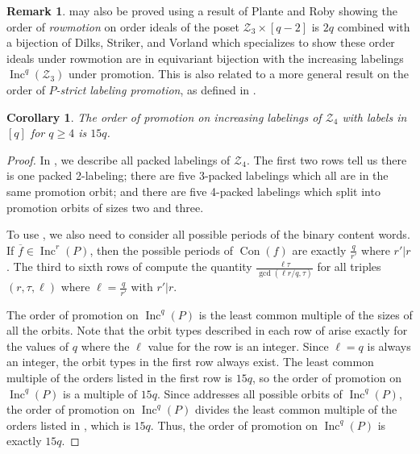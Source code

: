 \documentclass[11pt]{amsart}
\newtheorem{corollary}[theorem]{Corollary}
\theoremstyle{definition}
\newtheorem{remark}[theorem]{Remark}
\DeclareMathOperator{\Inc}{\mathrm{Inc}}
\DeclareMathOperator{\Con}{\mathrm{Con}}
\newcommand{\calZ}{\mathcal{Z}}
\begin{document}
\begin{remark}
 may also be proved using a result of Plante and Roby \cite[Theorem 3.3]{PlanteRobyFPSAC2024} showing the order of \emph{rowmotion} on order ideals of the poset  $\calZ_3\times[q-2]$ is $2q$ combined with a bijection of Dilks, Striker, and Vorland \cite{dilks2019rowmotion} which specializes to show these order ideals under rowmotion are in equivariant bijection with the increasing labelings $\Inc^q(\calZ_3)$ under promotion.
This is also related to a more general result \cite[Theorem 4]{adenbaum2023order} on the order of \emph{$P$-strict labeling promotion}, as defined in \cite{bernstein2024p}.
\end{remark}


\begin{corollary}\label{thm:linear-Z4}
The order of promotion on increasing labelings of $\calZ_4$ with labels in $[q]$ for $q \geq 4$ is $15q$.
\end{corollary}

\begin{proof}
In , we describe all packed labelings of $\calZ_4$.
The first two rows tell us there is one packed 2-labeling; there are five 3-packed labelings which all are in the same promotion orbit; and there are five 4-packed labelings which split into promotion orbits of sizes two and three.

To use , we also need to consider all possible periods of the binary content words. If $\overline{f} \in \Inc^r(P)$, then the possible periods of $\Con(f)$ are exactly $\frac{q}{r'}$ where $r' \vert r$. 
The third to sixth rows of  compute the quantity $\frac{\ell \tau}{\gcd(\ell r/q,\tau)}$ for all triples $(r,\tau,\ell)$ where $\ell = \frac{q}{r'}$ with $r' \vert r$.

The order of promotion on $\Inc^q(P)$ is the least common multiple of the sizes of all the orbits.  Note that the orbit types described in each row of  arise exactly for the values of $q$ where the $\ell$ value for the row is an integer.  Since $\ell=q$ is always an integer, the orbit types in the first row always exist.  The least common multiple of the orders listed in the first row is $15q$, so the order of promotion on $\Inc^q(P)$ is a multiple of $15q$.  Since  addresses all possible orbits of $\Inc^q(P)$, the order of promotion on $\Inc^q(P)$ divides the least common multiple of the orders listed in , which is $15q$. Thus, the order of promotion on $\Inc^q(P)$ is exactly $15q$.
\end{proof}
\end{document}
